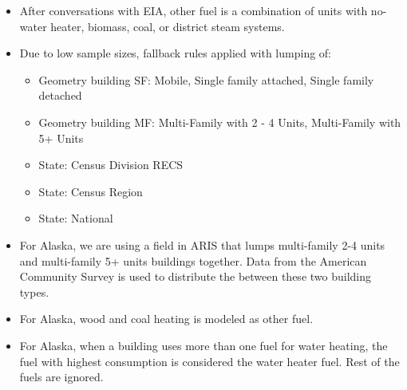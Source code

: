 \begin{itemize}
\item After conversations with EIA, other fuel is a combination of units with no-water heater, biomass, coal, or district steam systems.
\item Due to low sample sizes, fallback rules applied with lumping of:
  \begin{itemize}
  \item Geometry building SF: Mobile, Single family attached, Single family detached
  \item Geometry building MF: Multi-Family with 2 - 4 Units, Multi-Family with 5+ Units
  \item State: Census Division RECS
  \item State: Census Region
  \item State: National
  \end{itemize}
\item For Alaska, we are using a field in ARIS that lumps multi-family 2-4 units and multi-family 5+ units buildings together. Data from the American Community Survey is used to distribute the between these two building types.
\item For Alaska, wood and coal heating is modeled as other fuel.
\item For Alaska, when a building uses more than one fuel for water heating, the fuel with highest consumption is considered the water heater fuel. Rest of the fuels are ignored.
\end{itemize}
